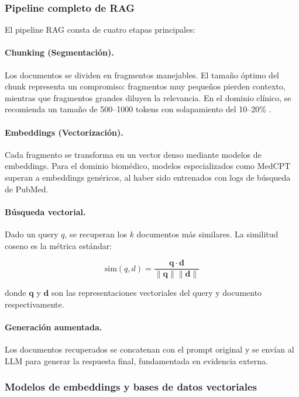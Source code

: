 \subsubsection{Pipeline completo de RAG}

El pipeline \ac{RAG} consta de cuatro etapas principales:

\paragraph{Chunking (Segmentación).} Los documentos se dividen en fragmentos manejables. El tamaño óptimo del chunk representa un compromiso: fragmentos muy pequeños pierden contexto, mientras que fragmentos grandes diluyen la relevancia. En el dominio clínico, se recomienda un tamaño de 500--1000 tokens con solapamiento del 10--20\% \parencite{manathunga2023rag_medical}.

\paragraph{Embeddings (Vectorización).} Cada fragmento se transforma en un vector denso mediante modelos de embeddings. Para el dominio biomédico, modelos especializados como MedCPT \parencite{jin2023medcpt} superan a embeddings genéricos, al haber sido entrenados con logs de búsqueda de PubMed.

\paragraph{Búsqueda vectorial.} Dado un query $q$, se recuperan los $k$ documentos más similares. La similitud coseno es la métrica estándar:

\begin{equation}
\text{sim}(q, d) = \frac{\mathbf{q} \cdot \mathbf{d}}{\|\mathbf{q}\| \|\mathbf{d}\|}
\label{eq:cosine_similarity}
\end{equation}

\noindent donde $\mathbf{q}$ y $\mathbf{d}$ son las representaciones vectoriales del query y documento respectivamente.

\paragraph{Generación aumentada.} Los documentos recuperados se concatenan con el prompt original y se envían al \ac{LLM} para generar la respuesta final, fundamentada en evidencia externa.

\subsubsection{Modelos de embeddings y bases de datos vectoriales}

